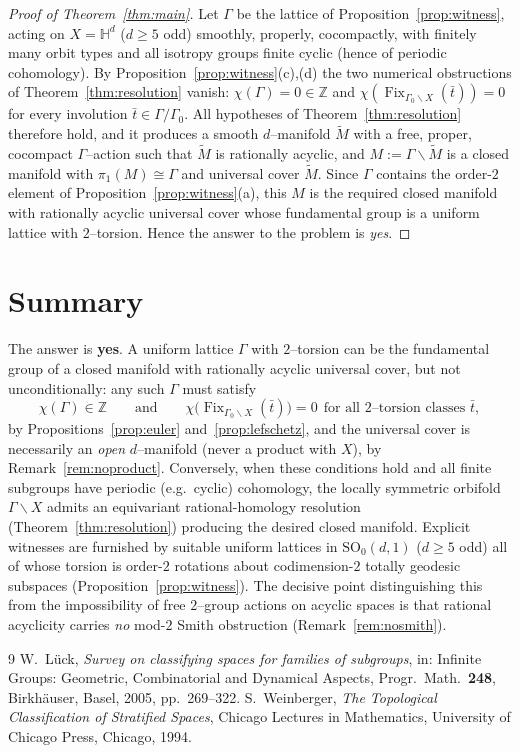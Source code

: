 \documentclass[12pt]{article}
\newcommand{\bZ}{\mathbb{Z}}
\newcommand{\Fix}{\operatorname{Fix}}
\theoremstyle{definition}
\begin{document}
\begin{proof}[Proof of Theorem~\ref{thm:main}]
Let $\Gamma$ be the lattice of Proposition~\ref{prop:witness}, acting on
$X=\mathbb H^d$ ($d\ge5$ odd) smoothly, properly, cocompactly, with finitely many
orbit types and all isotropy groups finite cyclic (hence of periodic cohomology).
By Proposition~\ref{prop:witness}(c),(d) the two numerical obstructions of
Theorem~\ref{thm:resolution} vanish:
$\chi(\Gamma)=0\in\bZ$ and $\chi(\Fix_{\Gamma_0\backslash X}(\bar t))=0$ for every
involution $\bar t\in\Gamma/\Gamma_0$.  All hypotheses of
Theorem~\ref{thm:resolution} therefore hold, and it produces a smooth
$d$--manifold $\widetilde M$ with a free, proper, cocompact $\Gamma$--action such
that $\widetilde M$ is rationally acyclic, and $M:=\Gamma\backslash\widetilde M$ is
a closed manifold with $\pi_1(M)\cong\Gamma$ and universal cover $\widetilde M$.
Since $\Gamma$ contains the order-$2$ element of
Proposition~\ref{prop:witness}(a), this $M$ is the required closed manifold with
rationally acyclic universal cover whose fundamental group is a uniform lattice
with $2$--torsion.  Hence the answer to the problem is \emph{yes}.
\end{proof}

\section{Summary}

The answer is \textbf{yes}.  A uniform lattice $\Gamma$ with $2$--torsion can be
the fundamental group of a closed manifold with rationally acyclic universal
cover, but not unconditionally: any such $\Gamma$ must satisfy
\[
   \chi(\Gamma)\in\bZ
   \qquad\text{and}\qquad
   \chi\bigl(\Fix_{\Gamma_0\backslash X}(\bar t)\bigr)=0\ \ \text{for all
   $2$--torsion classes }\bar t,
\]
by Propositions~\ref{prop:euler} and~\ref{prop:lefschetz}, and the universal
cover is necessarily an \emph{open} $d$--manifold (never a product with $X$),
by Remark~\ref{rem:noproduct}.  Conversely, when these conditions hold and all
finite subgroups have periodic (e.g.\ cyclic) cohomology, the locally symmetric
orbifold $\Gamma\backslash X$ admits an equivariant rational-homology resolution
(Theorem~\ref{thm:resolution}) producing the desired closed manifold.  Explicit
witnesses are furnished by suitable uniform lattices in $\mathrm{SO}_0(d,1)$
($d\ge5$ odd) all of whose torsion is order-$2$ rotations about codimension-$2$
totally geodesic subspaces (Proposition~\ref{prop:witness}).  The decisive point
distinguishing this from the impossibility of free $2$--group actions on acyclic
spaces is that rational acyclicity carries \emph{no} mod-$2$ Smith obstruction
(Remark~\ref{rem:nosmith}).

\begin{thebibliography}{9}
W.~L\"uck, \emph{Survey on classifying spaces for families of subgroups},
in: Infinite Groups: Geometric, Combinatorial and Dynamical Aspects,
Progr.\ Math.\ \textbf{248}, Birkh\"auser, Basel, 2005, pp.\ 269--322.
S.~Weinberger, \emph{The Topological Classification of Stratified Spaces},
Chicago Lectures in Mathematics, University of Chicago Press, Chicago, 1994.
\end{thebibliography}
\end{document}
